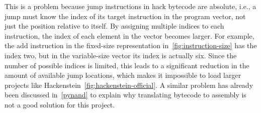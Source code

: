 This is a problem because jump instructions in hack bytecode are absolute, i.e., a jump must know the index of its target instruction in the program vector, not just the position relative to itself.
By assigning multiple indices to each instruction, the index of each element in the vector becomes larger.
For example, the add instruction in the fixed-size representation in~\cref{fig:instruction-size} has the index two, but in the variable-size vector its index is actually six.
Since the number of possible indices is limited, this leads to a significant reduction in the amount of available jump locations, which makes it impossible to load larger projects like Hackenstein~\ref{fig:hackenstein-official}.
A similar problem has already been discussed in~\cref{pynand} to explain why translating bytecode to assembly is not a good solution for this project.

